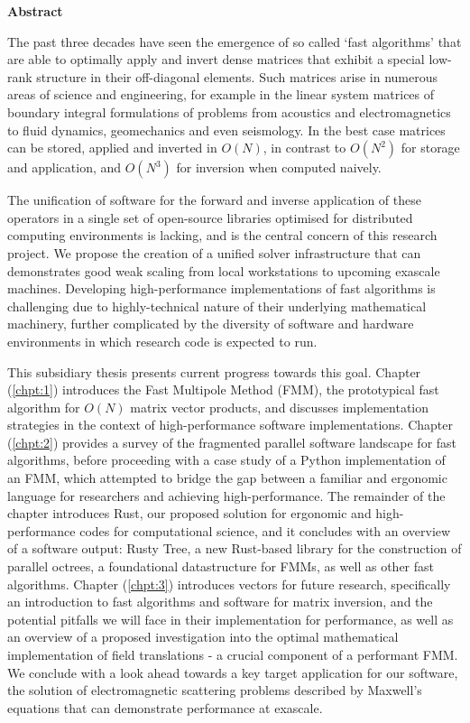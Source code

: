 \thispagestyle{plain}

\begin{center}
    \textbf{Abstract}
\end{center}

The past three decades have seen the emergence of so called `fast algorithms' that are able to optimally apply and invert dense matrices that exhibit a special low-rank structure in their off-diagonal elements. Such matrices arise in numerous areas of science and engineering, for example in the linear system matrices of boundary integral formulations of problems from acoustics and electromagnetics to fluid dynamics, geomechanics and even seismology. In the best case matrices can be stored, applied and inverted in $O(N)$, in contrast to $O(N^2)$ for storage and application, and $O(N^3)$ for inversion when computed naively.

The unification of software for the forward and inverse application of these operators in a single set of open-source libraries optimised for distributed computing environments is lacking, and is the central concern of this research project. We propose the creation of a unified solver infrastructure that can demonstrates good weak scaling from local workstations to upcoming exascale machines. Developing high-performance implementations of fast algorithms is challenging due to highly-technical nature of their underlying mathematical machinery, further complicated by the diversity of software and hardware environments in which research code is expected to run.

This subsidiary thesis presents current progress towards this goal. Chapter (\ref{chpt:1}) introduces the Fast Multipole Method (FMM), the prototypical fast algorithm for $O(N)$ matrix vector products, and discusses implementation strategies in the context of high-performance software implementations. Chapter (\ref{chpt:2}) provides a survey of the fragmented parallel software landscape for fast algorithms, before proceeding with a case study of a Python implementation of an FMM, which attempted to bridge the gap between a familiar and ergonomic language for researchers and achieving high-performance. The remainder of the chapter introduces Rust, our proposed solution for ergonomic and high-performance codes for computational science, and it concludes with an overview of a software output: Rusty Tree, a new Rust-based library for the construction of parallel octrees, a foundational datastructure for FMMs, as well as other fast algorithms. Chapter (\ref{chpt:3}) introduces vectors for future research, specifically an introduction to fast algorithms and software for matrix inversion, and the potential pitfalls we will face in their implementation for performance, as well as an overview of a proposed investigation into the optimal mathematical implementation of field translations - a crucial component of a performant FMM. We conclude with a look ahead towards a key target application for our software, the solution of electromagnetic scattering problems described by Maxwell's equations that can demonstrate performance at exascale.
